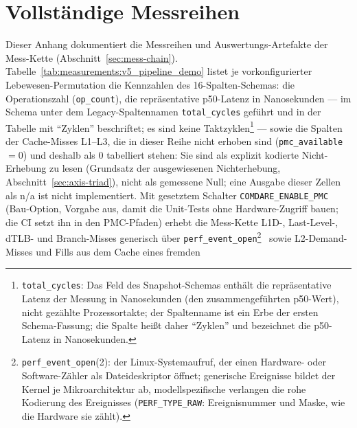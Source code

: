 \chapter{Vollständige Messreihen}\label{app:measurements}
\newif\ifPlatzhalterAlsTabelle%
\PlatzhalterAlsTabelletrue%
\newcommand{\PlatzhalterTabRef}[1]{\ifPlatzhalterAlsTabelle\else{} (Tabelle~\ref{#1})\fi}


Dieser Anhang dokumentiert die Messreihen und Auswertungs-Artefakte der Mess-Kette
(Abschnitt~\ref{sec:mess-chain}). Tabelle~\ref{tab:measurements:v5_pipeline_demo} listet je
vorkonfigurierter Lebewesen-Permutation die Kennzahlen des 16-Spalten-Schemas: die Operationszahl
(\texttt{op\_count}), die repräsentative p50-Latenz in Nanosekunden --- im Schema unter dem
Legacy-Spaltennamen \texttt{total\_cycles} geführt und in der Tabelle mit \enquote{Zyklen}
beschriftet; es sind keine Taktzyklen\footnote{\texttt{total\_cycles}: Das Feld des Snapshot-Schemas
enthält die repräsentative Latenz der Messung in Nanosekunden (den zusammengeführten p50-Wert), nicht
gezählte Prozessortakte; der Spaltenname ist ein Erbe der ersten Schema-Fassung; die Spalte heißt daher
\enquote{Zyklen} und bezeichnet die p50-Latenz in Nanosekunden.} --- sowie die Spalten der Cache-Misses L1--L3, die in
dieser Reihe nicht erhoben sind (\texttt{pmc\_available} $= 0$) und deshalb als 0 tabelliert stehen:
Sie sind als explizit kodierte Nicht-Erhebung zu lesen (Grundsatz der ausgewiesenen Nichterhebung,
Abschnitt~\ref{sec:axis-triad}), nicht als gemessene Null; eine Ausgabe dieser Zellen als n/a ist nicht
implementiert. Mit gesetztem Schalter \texttt{COMDARE\_ENABLE\_PMC} (Bau-Option, Vorgabe aus,
damit die Unit-Tests ohne Hardware-Zugriff bauen; die CI setzt ihn in den PMC-Pfaden) erhebt die
Mess-Kette L1D-, Last-Level-, dTLB- und Branch-Misses generisch über
\texttt{perf\_event\_open}\footnote{\texttt{perf\_event\_open}(2): der Linux-Systemaufruf, der einen
Hardware- oder Software-Zähler als Dateideskriptor öffnet; generische Ereignisse bildet der Kernel je
Mikroarchitektur ab, modellspezifische verlangen die rohe Kodierung des Ereignisses
(\texttt{PERF\_TYPE\_RAW}: Ereignisnummer und Maske, wie die Hardware sie
zählt).}~\cite{demelo2010perf} sowie L2-Demand-Misses und Fills aus dem Cache eines fremden
